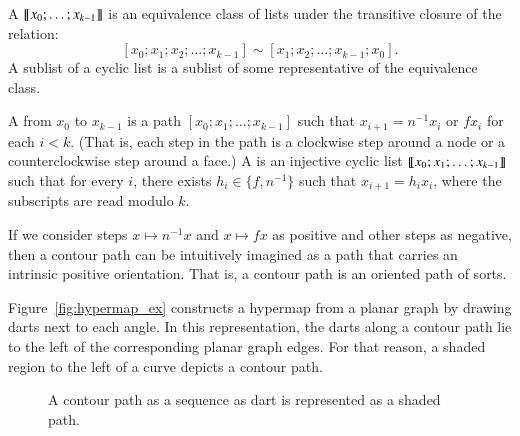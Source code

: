 \begin{definition}\label{def:cyclic:list}
   
  A  ${\llbracket{x_0;\ldots;x_{k-1}}\rrbracket}$ is an equivalence
  class of lists under the transitive closure of the relation:
\[ 
[x_0;x_1;x_2;\ldots;x_{k-1}] \sim [x_1;x_2;\ldots;x_{k-1};x_0].
\] 
A sublist of a cyclic list is a sublist of some representative of the
equivalence class.
\end{definition}

\begin{definition}
 A  from
$x_0$ to $x_{k-1}$ is a path $[x_0;x_1;\ldots;x_{k-1}]$ such that
$x_{i+1} = n^{-1} x_i$ or $f x_i$ for each $i<k$.  (That is, each
step in the path is a clockwise step around a node or a
counterclockwise step around a face.)  
A  is an injective cyclic list
${\llbracket{x_0;x_1;\ldots;x_{k-1}}\rrbracket}$ such that
for every $i$, there exists $h_i\in \{f,n^{-1}\}$ such that $x_{i+1} = h_i x_i$, 
where the subscripts are
read modulo $k$.
%
%
%
\end{definition}


If we consider steps $x\mapsto n^{-1} x$ and $x\mapsto f x $ as
positive and other steps as negative, then a contour path can be
intuitively imagined as a path that carries an intrinsic positive
orientation.  That is, a contour path is an oriented path of sorts.



\begin{remark}
 Figure~\ref{fig:hypermap_ex}
  constructs a hypermap from a planar graph by drawing darts next to
  each angle.  In this representation, the darts along a contour path
  lie to the left of the corresponding planar graph edges.  For that
  reason, a shaded region to the left of a curve depicts a contour
  path.
\end{remark}

\begin{figure}[htb]
\centering
{}
\caption{A contour path as a sequence as dart is represented as a
shaded path.}
\label{fig:shade-dart}
\end{figure}

